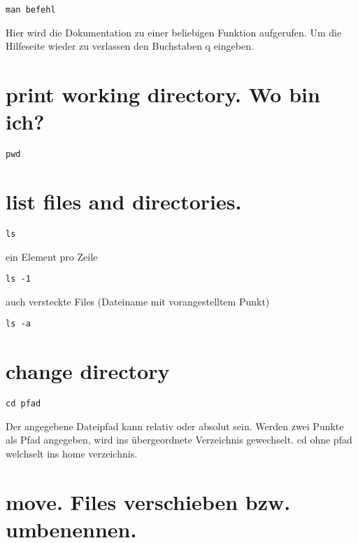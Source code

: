 \documentclass[]{book}
\begin{document}
\begin{verbatim}
man befehl
\end{verbatim}

Hier wird die Dokumentation zu einer beliebigen Funktion aufgerufen.
Um die Hilfeseite wieder zu verlassen den Buchstaben q eingeben.

\hypertarget{print-working-directory.-wo-bin-ich}{%
\section{print working directory. Wo bin ich?}\label{print-working-directory.-wo-bin-ich}}

\begin{verbatim}
pwd
\end{verbatim}

\hypertarget{list-files-and-directories.}{%
\section{list files and directories.}\label{list-files-and-directories.}}

\begin{verbatim}
ls
\end{verbatim}

ein Element pro Zeile

\begin{verbatim}
ls -1
\end{verbatim}

auch versteckte Files (Dateiname mit vorangestelltem Punkt)

\begin{verbatim}
ls -a
\end{verbatim}

\hypertarget{change-directory}{%
\section{change directory}\label{change-directory}}

\begin{verbatim}
cd pfad
\end{verbatim}

Der angegebene Dateipfad kann relativ oder absolut sein. Werden zwei Punkte als Pfad angegeben, wird ins übergeordnete Verzeichnis gewechselt.
cd ohne pfad welchselt ins home verzeichnis.

\hypertarget{move.-files-verschieben-bzw.-umbenennen.}{%
\section{move. Files verschieben bzw. umbenennen.}\label{move.-files-verschieben-bzw.-umbenennen.}}
\end{document}
